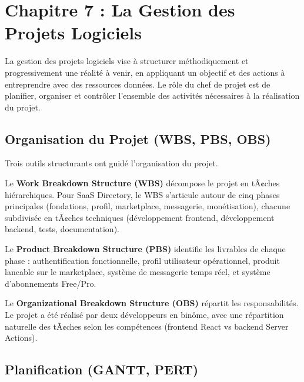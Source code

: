 
\section{Chapitre 7 : La Gestion des Projets Logiciels}



La gestion des projets logiciels vise à structurer méthodiquement et progressivement une réalité à venir, en appliquant un objectif et des actions à entreprendre avec des ressources données. Le rôle du chef de projet est de planifier, organiser et contrôler l'ensemble des activités nécessaires à la réalisation du projet.



\subsection{Organisation du Projet (WBS, PBS, OBS)}



Trois outils structurants ont guidé l'organisation du projet.



Le \textbf{Work Breakdown Structure (WBS)} décompose le projet en tÃ¢ches hiérarchiques. Pour SaaS Directory, le WBS s'articule autour de cinq phases principales (fondations, profil, marketplace, messagerie, monétisation), chacune subdivisée en tÃ¢ches techniques (développement frontend, développement backend, tests, documentation).



Le \textbf{Product Breakdown Structure (PBS)} identifie les livrables de chaque phase : authentification fonctionnelle, profil utilisateur opérationnel, produit lancable sur le marketplace, système de messagerie temps réel, et système d'abonnements Free/Pro.



Le \textbf{Organizational Breakdown Structure (OBS)} répartit les responsabilités. Le projet a été réalisé par deux développeurs en binôme, avec une répartition naturelle des tÃ¢ches selon les compétences (frontend React vs backend Server Actions).



\subsection{Planification (GANTT, PERT)}



